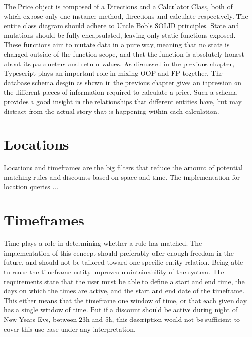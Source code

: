 
The Price object is composed of a Directions and a Calculator Class, both of which expose only one instance method, directions and calculate respectively. The entire class diagram should adhere to Uncle Bob's SOLID principles. State and mutations should be fully encapsulated, leaving only static functions exposed. These functions aim to mutate data in a pure way, meaning that no state is changed outside of the function scope, and that the function is absolutely honest about its parameters and return values. As discussed in the previous chapter, Typescript plays an important role in mixing OOP and FP together. The database schema desgin as shown in the previous chapter gives an inpression on the different pieces of information required to calculate a price. Such a schema provides a good insight in the relationships that different entities have, but may distract from the actual story that is happening within each calculation.



%
\section{Locations}
Locations and timeframes are the big filters that reduce the amount of potential matching rules and discounts based on space and time. The implementation for location queries ...

%
\section{Timeframes}
Time plays a role in determining whether a rule has matched. The implementation of this concept should preferably offer enough freedom in the future, and should not be tailored toward one specific entity relation. Being able to reuse the timeframe entity improves maintainability of the system. The requirements state that the user must be able to define a start and end time, the days on which the times are active, and the start and end date of the timeframe. This either means that the timeframe one window of time, or that each given day has a single window of time. But if a discount should be active during night of New Years Eve, between 23h and 5h, this description would not be sufficient to cover this use case under any interpretation.

